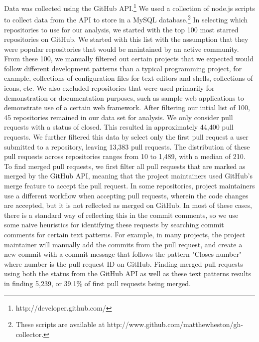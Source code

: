 \documentclass{iitthesis}
\begin{document}
 \label{sec:datacollection}

Data was collected using the GitHub API.\footnote{http://developer.github.com/}
We used a collection of node.js scripts to collect data from the API to store in
a MySQL database.\footnote{These scripts are available at
http://www.github.com/matthewheston/gh-collector.} In selecting which
repositories to use for our analysis, we started with the top 100 most starred
repositories on GitHub. We started with this list with the assumption that they
were popular repositories that would be maintained by an active community. From
these 100, we manually filtered out certain projects that we expected would
follow different development patterns than a typical programming project, for
example, collections of configuration files for text editors and shells,
collections of icons, etc. We also excluded repositories that were used
primarily for demonstration or documentation purposes, such as sample web
applications to demonstrate use of a certain web framework. After filtering our
intial list of 100, 45 repositories remained in our data set for analysis. We
only consider pull requests with a status of closed. This resulted in
approximately 44,400 pull requests. We further filtered this data by select only
the first pull request a user submitted to a repository, leaving 13,383 pull
requests. The distribution of these pull requests across repositories ranges
from 10 to 1,489, with a median of 210. To find merged pull requests, we first
filter all pull requests that are marked as merged by the GitHub API, meaning
that the project maintainers used GitHub's merge feature to accept the pull
request. In some repositories, project maintainers use a different workflow when
accepting pull requests, wherein the code changes are accepted, but it is not
reflected as merged on GitHub. In most of these cases, there is a standard way
of reflecting this in the commit comments, so we use some naive heuristics for
identifying these requests by searching commit comments for certain text
patterns. For example, in many projects, the project maintainer will manually
add the commits from the pull request, and create a new commit with a commit
message that follows the pattern "Closes {number}" where {number} is the pull
request ID on GitHub. Finding merged pull requests using both the status from
the GitHub API as well as these text patterns results in finding 5,239, or
39.1\% of first pull requests being merged.

 \label{sec:data_analysis}
\end{document}
